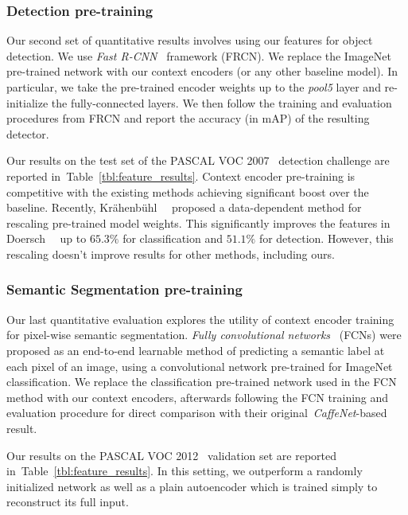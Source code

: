 \documentclass[10pt,twocolumn,letterpaper]{article}
\newcommand{\reftbl}[1]{Table~\ref{tbl:#1}}
\begin{document}
\subsubsection{Detection pre-training}
\label{sec:detect}
Our second set of quantitative results involves using our features for object detection.
We use \textit{Fast R-CNN}~\cite{fastrcnn} framework (FRCN).
We replace the ImageNet pre-trained network with our context encoders (or any other baseline model).
In particular, we take the pre-trained encoder weights up to the \textit{pool5} layer and re-initialize the fully-connected layers.
We then follow the training and evaluation procedures from FRCN and report the accuracy (in mAP) of the resulting detector.

Our results on the test set of the PASCAL VOC 2007~\cite{everingham2014pascal} detection challenge are reported in~\reftbl{feature_results}.
%
%
Context encoder pre-training is competitive with the existing methods achieving significant boost over the baseline.
Recently, Kr\"ahenb\"uhl~\etal~\cite{krahenbuhl2015data} proposed a data-dependent method for rescaling pre-trained model weights.
This significantly improves the features in Doersch~\etal~\cite{doersch2015unsupervised} up to $65.3\%$ for classification and $51.1\%$ for detection.
However, this rescaling doesn't improve results for other methods, including ours.
%

%
%
%
%
%

\subsubsection{Semantic Segmentation pre-training}
\label{sec:fcn}
Our last quantitative evaluation explores the utility of context encoder training for pixel-wise semantic segmentation.
\textit{Fully convolutional networks}~\cite{long2014fully} (FCNs) were proposed as an end-to-end learnable method of predicting a semantic label at each pixel of an image, using a convolutional network pre-trained for ImageNet classification.
We replace the classification pre-trained network used in the FCN method with our context encoders, afterwards following the FCN training and evaluation procedure for direct comparison with their original~\textit{CaffeNet}-based result.

Our results on the PASCAL VOC 2012~\cite{everingham2014pascal} validation set are reported in~\reftbl{feature_results}.
%
%
In this setting, we outperform a randomly initialized network as well as a plain autoencoder which is trained simply to reconstruct its full input.
\end{document}
